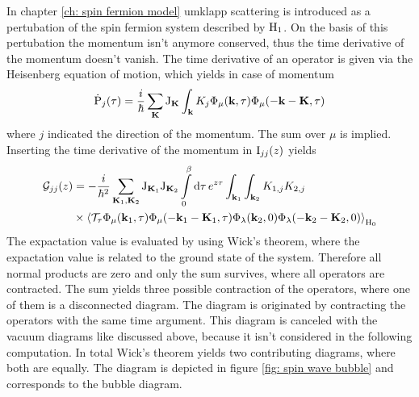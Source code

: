 In chapter \ref{ch: spin fermion model} umklapp scattering is introduced as a pertubation of the spin fermion system described by $\mathrm{H}_{1}$.
On the basis of this pertubation the momentum isn't anymore conserved, thus the time derivative of the momentum doesn't vanish.
The time derivative of an operator is given via the Heisenberg equation of motion, which yields in case of momentum
%
\begin{align}
	\dot{\mathrm{P}}_{j}(\tau) = \frac{i}{\hbar} \sum\limits_{\vb{K}} \mathrm{J}_{\vb{K}} \int_{\vb{k}} K_{j} \Phi_{\mu}(\vb{k},\tau) \Phi_{\mu}(-\vb{k} - \vb{K},\tau)
\end{align}
%
where $j$ indicated the direction of the momentum.
The sum over $\mu$ is implied.
Inserting the time derivative of the momentum in $\mathrm{I}_{jj}(z)$ yields
%
\begin{align}
	\mathcal{G}_{jj}(z) &= 
		-\frac{i}{\hbar^{2}} 
		\sum\limits_{\vb{K}_{1}, \vb{K}_{2}} 
		\mathrm{J}_{\vb{K}_{1}} \mathrm{J}_{\vb{K}_{2}} 
		\int\limits_{0}^{\beta} \dd{\tau} e^{z \tau} 
		\int_{\vb{k}_{1}}\int_{\vb{k}_{2}} K_{1,j}  K_{2,j} 
		\notag \\
		&\times
		\expval{\mathcal{T}_{\tau} \Phi_{\mu}(\vb{k}_{1},\tau) \Phi_{\mu}(-\vb{k}_{1} - \vb{K}_{1},\tau) \Phi_{\lambda}(\vb{k}_{2},0) \Phi_{\lambda}(-\vb{k}_{2} - \vb{K}_{2},0)}_{\mathrm{H}_{0}}
\end{align}
%
The expactation value is evaluated by using Wick's theorem, where the expactation value is related to the ground state of the system.
Therefore all normal products are zero and only the sum survives, where all operators are contracted.
The sum yields three possible contraction of the operators, where one of them is a disconnected diagram.
The diagram is originated by contracting the operators with the same time argument.
This diagram is canceled with the vacuum diagrams like discussed above, because it isn't considered in the following computation.
In total Wick's theorem yields two contributing diagrams, where both are equally.
The diagram is depicted in figure \ref{fig: spin wave bubble} and corresponds to the bubble diagram.

